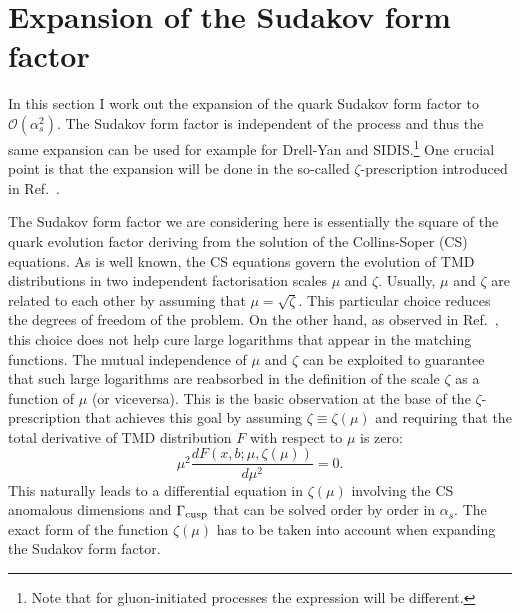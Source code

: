 \documentclass[10pt,a4paper]{article}
\begin{document}
\section{Expansion of the Sudakov form factor}

In this section I work out the expansion of the quark Sudakov form
factor to $\mathcal{O}(\alpha_s^2)$. The Sudakov form factor is
independent of the process and thus the same expansion can be used for
example for Drell-Yan and SIDIS.\footnote{Note that for
  gluon-initiated processes the expression will be different.} One
crucial point is that the expansion will be done in the so-called
$\zeta$-prescription introduced in Ref.~\cite{Scimemi:2017etj}.

The Sudakov form factor we are considering here is essentially the
square of the quark evolution factor deriving from the solution of the
Collins-Soper (CS) equations. As is well known, the CS equations
govern the evolution of TMD distributions in two independent
factorisation scales $\mu$ and $\zeta$. Usually, $\mu$ and $\zeta$ are
related to each other by assuming that $\mu=\sqrt{\zeta}$. This
particular choice reduces the degrees of freedom of the problem. On
the other hand, as observed in Ref.~\cite{Scimemi:2017etj}, this
choice does not help cure large logarithms that appear in the matching
functions. The mutual independence of $\mu$ and $\zeta$ can be
exploited to guarantee that such large logarithms are reabsorbed in
the definition of the scale $\zeta$ as a function of $\mu$ (or
viceversa). This is the basic observation at the base of the
$\zeta$-prescription that achieves this goal by assuming
$\zeta\equiv\zeta(\mu)$ and requiring that the total derivative of TMD
distribution $F$ with respect to $\mu$ is zero:
\begin{equation}\label{eq:zetapresc}
\mu^2\frac{dF\left(x,b;\mu,\zeta(\mu)\right)}{d\mu^2} = 0.
\end{equation}
This naturally leads to a differential equation in $\zeta(\mu)$
involving the CS anomalous dimensions and $\Gamma_{\rm cusp}$ that can
be solved order by order in $\alpha_s$. The exact form of the function
$\zeta(\mu)$ has to be taken into account when expanding the Sudakov
form factor.
\end{document}
